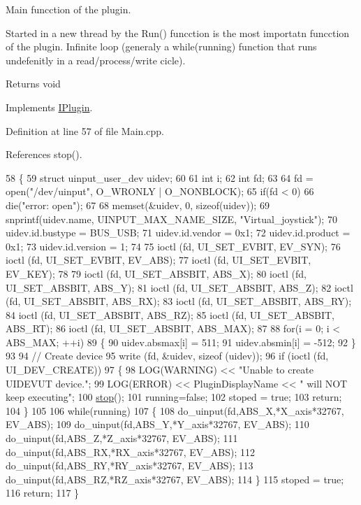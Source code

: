 Main funcction of the plugin. 

Started in a new thread by the Run() funcction is the most importatn funcction of the plugin. Infinite loop (generaly a while(running) function that runs undefenitly in a read/process/write cicle). \begin{DoxyReturn}{Returns}
void 
\end{DoxyReturn}


Implements \hyperlink{class_i_plugin_ab5fdb3b0f7afdcee04324dca01766749}{I\+Plugin}.



Definition at line 57 of file Main.\+cpp.



References stop().


\begin{DoxyCode}
58 \{
59     \textcolor{keyword}{struct }uinput\_user\_dev uidev;
60 
61     \textcolor{keywordtype}{int}                    i;
62     \textcolor{keywordtype}{int}                    fd;
63 
64     fd = open(\textcolor{stringliteral}{"/dev/uinput"}, O\_WRONLY | O\_NONBLOCK);
65     \textcolor{keywordflow}{if}(fd < 0)
66         die(\textcolor{stringliteral}{"error: open"});
67 
68     memset(&uidev, 0, \textcolor{keyword}{sizeof}(uidev));
69     snprintf(uidev.name, UINPUT\_MAX\_NAME\_SIZE, \textcolor{stringliteral}{"Virtual\_joystick"});
70     uidev.id.bustype = BUS\_USB;
71     uidev.id.vendor  = 0x1;
72     uidev.id.product = 0x1;
73     uidev.id.version = 1;
74 
75     ioctl (fd, UI\_SET\_EVBIT, EV\_SYN);
76     ioctl (fd, UI\_SET\_EVBIT, EV\_ABS);
77     ioctl (fd, UI\_SET\_EVBIT, EV\_KEY);
78 
79     ioctl (fd, UI\_SET\_ABSBIT, ABS\_X);
80     ioctl (fd, UI\_SET\_ABSBIT, ABS\_Y);
81     ioctl (fd, UI\_SET\_ABSBIT, ABS\_Z);
82     ioctl (fd, UI\_SET\_ABSBIT, ABS\_RX);
83     ioctl (fd, UI\_SET\_ABSBIT, ABS\_RY);
84     ioctl (fd, UI\_SET\_ABSBIT, ABS\_RZ);
85     ioctl (fd, UI\_SET\_ABSBIT, ABS\_RT);
86     ioctl (fd, UI\_SET\_ABSBIT, ABS\_MAX);
87 
88     \textcolor{keywordflow}{for}(i = 0; i < ABS\_MAX; ++i)
89     \{
90         uidev.absmax[i] = 511;
91         uidev.absmin[i] = -512;
92     \}
93 
94     \textcolor{comment}{// Create device}
95     write (fd, &uidev, \textcolor{keyword}{sizeof} (uidev));
96     \textcolor{keywordflow}{if} (ioctl (fd, UI\_DEV\_CREATE))
97     \{
98         LOG(WARNING) << \textcolor{stringliteral}{"Unable to create UIDEVUT device."};
99         LOG(ERROR) << PluginDisplayName << \textcolor{stringliteral}{" will NOT keep executing"};
100         \hyperlink{class_joystick___writer_a3c606f3961eea4b6a371146479ca26da}{stop}();
101     running=\textcolor{keyword}{false};
102     stoped = \textcolor{keyword}{true};
103     \textcolor{keywordflow}{return};
104     \}
105 
106     \textcolor{keywordflow}{while}(running)
107     \{
108         do\_uinput(fd,ABS\_X,*X\_axis*32767, EV\_ABS);
109         do\_uinput(fd,ABS\_Y,*Y\_axis*32767, EV\_ABS);
110         do\_uinput(fd,ABS\_Z,*Z\_axis*32767, EV\_ABS);
111         do\_uinput(fd,ABS\_RX,*RX\_axis*32767, EV\_ABS);
112         do\_uinput(fd,ABS\_RY,*RY\_axis*32767, EV\_ABS);
113         do\_uinput(fd,ABS\_RZ,*RZ\_axis*32767, EV\_ABS);
114     \}
115     stoped = \textcolor{keyword}{true};
116     \textcolor{keywordflow}{return};
117 \}
\end{DoxyCode}
